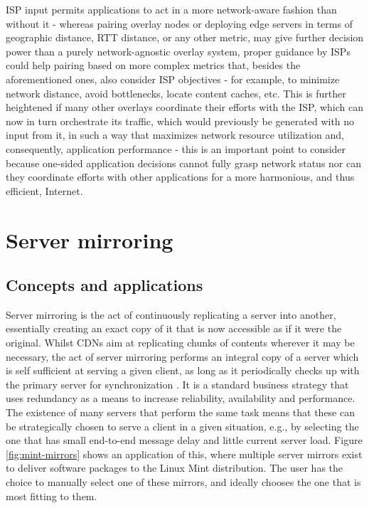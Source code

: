         ISP input permits applications to act in a more network-aware fashion than without it - whereas pairing overlay nodes or deploying edge servers in terms of geographic distance, RTT distance, or any other metric, may give further decision power than a purely network-agnostic overlay system, proper guidance by ISPs could help pairing based on more complex metrics that, besides the aforementioned ones, also consider ISP objectives - for example, to minimize network distance, avoid bottlenecks, locate content caches, etc.
        This is further heightened if many other overlays coordinate their efforts with the ISP, which can now in turn orchestrate its traffic, which would previously be generated with no input from it, in such a way that maximizes network resource utilization and, consequently, application performance - this is an important point to consider because one-sided application decisions cannot fully grasp network status nor can they coordinate efforts with other applications for a more harmonious, and thus efficient, Internet.


    \section{Server mirroring}

    \subsection{Concepts and applications}

        Server mirroring is the act of continuously replicating a server into another, essentially creating an exact copy of it that is now accessible as if it were the original.
        Whilst CDNs aim at replicating chunks of contents wherever it may be necessary, the act of server mirroring performs an integral copy of a server which is self sufficient at serving a given client, as long as it periodically checks up with the primary server for synchronization .
        It is a standard business strategy that uses redundancy as a means to increase reliability, availability and performance.
        The existence of many servers that perform the same task means that these can be strategically chosen to serve a client in a given situation, e.g., by selecting the one that has small end-to-end message delay and little current server load.
        Figure \ref{fig:mint-mirrors} shows an application of this, where multiple server mirrors exist to deliver software packages to the Linux Mint distribution. The user has the choice to manually select one of these mirrors, and ideally chooses the one that is most fitting to them.

